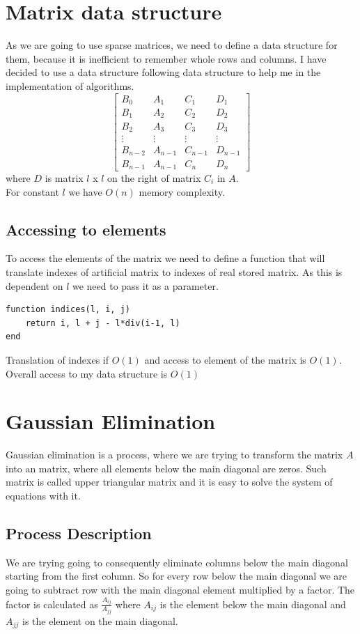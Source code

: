 \documentclass[11pt]{article}
\begin{document}
\section{Matrix data structure}
As we are going to use sparse matrices, we need to define a data structure for them, 
because it is inefficient to remember whole rows and columns.
I have decided to use a data structure following data structure to help me in the implementation of algorithms.
$$
    \begin{bmatrix}
        B_{0} & A_{1} & C_{1} & D_{1} \\
        B_{1} & A_{2} & C_{2} & D_{2} \\
        B_{2} & A_{3} & C_{3} & D_{3} \\
        \vdots & \vdots & \vdots & \vdots \\
        B_{n-2} & A_{n-1} & C_{n-1} & D_{n-1} \\
        B_{n-1} & A_{n-1} & C_{n} & D_{n}
    \end{bmatrix}
$$
where $D$ is matrix $l$ x $l$ on the right of matrix $C_i$ in $A$. \\
For constant $l$ we have $O(n)$ memory complexity.
\subsection*{Accessing to elements}
To access the elements of the matrix we need to define a function that will translate indexes of artificial matrix to indexes of real stored matrix.
As this is dependent on $l$ we need to pass it as a parameter.
\begin{lstlisting}
function indices(l, i, j)
    return i, l + j - l*div(i-1, l)
end
\end{lstlisting}
Translation of indexes if $O(1)$ and access to element of the matrix is $O(1)$.
Overall access to my data structure is $O(1)$

\section{Gaussian Elimination}
Gaussian elimination is a process, where we are trying to transform the matrix $A$ into an matrix, where all elements below the main diagonal are zeros.
Such matrix is called upper triangular matrix and it is easy to solve the system of equations with it.
\subsection*{Process Description}
We are trying going to consequently eliminate columns below the main diagonal starting from the first column.
So for every row below the main diagonal we are going to subtract row with the main diagonal element multiplied by a factor.
The factor is calculated as $\frac{A_{ij}}{A_{jj}}$ where $A_{ij}$ is the element below the main diagonal and $A_{jj}$ is the element on the main diagonal.
\end{document}
